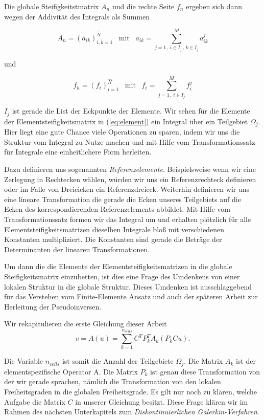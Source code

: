 Die globale Steifigkeitstmatrix $A_n$ und die rechte Seite $f_n$ ergeben sich dann wegen der Addivität des Integrals als Summen

\begin{equation*}
A_n = (a_{ik})_{i,k=1}^{\hat{N}} \, \, \, \text{ mit } \, \, \, a_{ik} = \sum_{j=1 \, , \, i \in I_j \, , \, k \in I_j }^M a_{ik}^j 
\end{equation*}

und

\begin{equation*}
f_h = (f_i)_{i=1}^{\hat{N}} \, \, \, \text{ mit } \, \, \, f_i = \sum_{j=1 \, , \, i \in I_j}^M f_i^j
\end{equation*}

$I_j$ ist gerade die List der Eckpunkte der Elemente.
Wir sehen für die Elemente der Elementsteifigkeitsmatrix in (\ref{eq:element}) ein Integral über ein Teilgebiet $\Omega_j$. Hier liegt eine gute Chance viele Operationen zu sparen, indem wir uns die Struktur vom Integral zu Nutze machen und mit Hilfe vom Transformationssatz für Integrale eine einheitlichere Form herleiten.

Dazu definieren uns sogenannten \textit{Referenzelemente}. Beispielsweise wenn wir eine Zerlegung in Rechtecken wählen, würden wir uns ein Referenzrechteck definieren oder im Falle von Dreieicken ein Referenzdreieck. Weiterhin definieren wir uns eine lineare Transformation die gerade die Ecken unseres Teilgebiets auf die Ecken des korrespondierenden Referenzelements abbildet. Mit Hilfe vom Transformationssatz formen wir das Integral um und erhalten plötzlich für alle Elementsteifigkeitsmatrizen dieselben Integrale bloß mit verschiedenen Konstanten multipliziert. Die Konstanten sind gerade die Beträge der Determinanten der linearen Transformationen.

Um dann die die Elemente der Elementsteifigkeitsmatrizen in die globale Steifigkeitsmatrix einzubetten, ist dies eine Frage des Umdenkens von einer lokalen Struktur in die globale Struktur.
Dieses Umdenken ist ausschlaggebend für das Verstehen vom Finite-Elemente Ansatz und auch der späteren Arbeit zur Herleitung der Pseudoinversen.

Wir rekapitulieren die erste Gleichung dieser Arbeit
\begin{equation} \label{eq:main2}
v=A(u)=\sum_{k=1}^{n_{cells}} C^T P_k^T A_k (P_k Cu).
\end{equation}

Die Variable $n_{cells}$ ist somit die Anzahl der Teilgebiete $\Omega_j$. Die Matrix $A_k$ ist der elementspezifische Operator A. Die Matrix $P_k$ ist genau diese Transformation von der wir gerade sprachen, nämlich die Transformation von den lokalen Freiheitsgraden in die globalen Freiheitsgrade. Es gilt nur noch zu klären, welche Aufgabe die Matrix $C$ in unserer Gleichung besitzt. Diese Frage klären wir im Rahmen des nächsten Unterkapitels zum \textit{Diskontinuierlichen Galerkin-Verfahren}.

